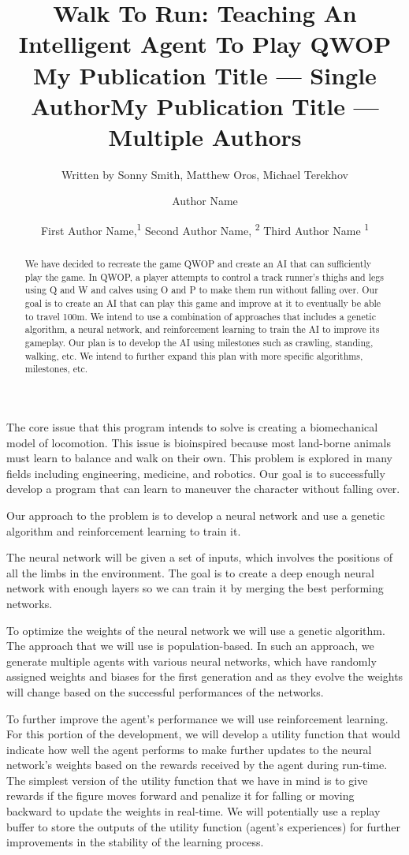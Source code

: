 \documentclass[letterpaper]{article} %
\title{Walk To Run: Teaching An  Intelligent Agent To Play QWOP }
\author{
    Written by Sonny Smith, Matthew Oros, Michael Terekhov
    \\
}
\title{My Publication Title --- Single Author}
\author {
    Author Name \\
}
\title{My Publication Title --- Multiple Authors}
\author {
    First Author Name,\textsuperscript{\rm 1}
    Second Author Name, \textsuperscript{\rm 2}
    Third Author Name \textsuperscript{\rm 1} \\
}
\begin{document}
\maketitle

\begin{abstract}
We have decided to recreate the game QWOP and create an AI that can sufficiently play the game. In QWOP, a player attempts to control a track runner’s thighs and legs using Q and W and calves using O and P to make them run without falling over. Our goal is to create an AI that can play this game and improve at it to eventually be able to travel 100m. We intend to use a combination of approaches that includes a genetic algorithm, a neural network, and reinforcement learning to train the AI to improve its gameplay. Our plan is to develop the AI using milestones such as crawling, standing, walking, etc. We intend to further expand this plan with more specific algorithms, milestones, etc.
\end{abstract}

\noindent The core issue that this program intends to solve is creating a biomechanical model of locomotion. This issue is bioinspired because most land-borne animals must learn to balance and walk on their own. This problem is explored in many fields including engineering, medicine, and robotics. Our goal is to successfully develop a program that can learn to maneuver the character without falling over.

Our approach to the problem is to develop a neural network and use a genetic algorithm and reinforcement learning to train it.

The neural network will be given a set of inputs, which involves the positions of all the limbs in the environment. The goal is to create a deep enough neural network with enough layers so we can train it by merging the best performing networks.

To optimize the weights of the neural network we will use a genetic algorithm. The approach that we will use is population-based. In such an approach, we generate multiple agents with various neural networks, which have randomly assigned weights and biases for the first generation and as they evolve the weights will change based on the successful performances of the networks.

To further improve the agent's performance we will use reinforcement learning. For this portion of the development, we will develop a utility function that would indicate how well the agent performs to make further updates to the neural network's weights based on the rewards received by the agent during run-time. The simplest version of the utility function that we have in mind is to give rewards if the figure moves forward and penalize it for falling or moving backward to update the weights in real-time. We will potentially use a replay buffer to store the outputs of the utility function (agent's experiences) for further improvements in the stability of the learning process.
\end{document}
